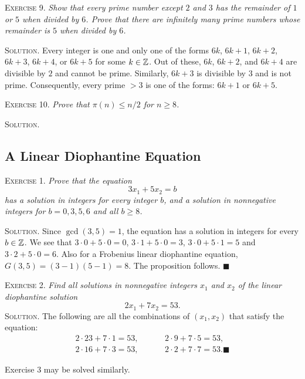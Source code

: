 \documentclass[11pt, leqno]{article}
\newcommand{\done}{\ensuremath{\blacksquare}}
\begin{document}
\textsc{Exercise 9}. \emph{Show that every prime number except $2$ and $3$ has the remainder of $1$ or $5$ when divided by $6$. Prove that there are infinitely many prime numbers whose remainder is $5$ when divided by $6$.}

\textsc{Solution}. Every integer is one and only one of the forms $6k$, $6k+1$, $6k+2$, $6k+3$, $6k+4$, or $6k+5$ for some $k\in\mathbb{Z}$. Out of these, $6k$, $6k+2$, and $6k+4$ are divisible by $2$ and cannot be prime. Similarly, $6k+3$ is divisible by $3$ and is not prime. Consequently, every prime $>3$ is one of the forms: $6k+1$ or $6k+5$.

\textsc{Exercise 10}. \emph{Prove that $\pi(n) \leq n/2$ for $n\geq 8$.}

\textsc{Solution}.

\subsection{A Linear Diophantine Equation}

\textsc{Exercise 1}. \emph{Prove that the equation 
\begin{displaymath}
3x_1 + 5x_2 = b
\end{displaymath}
has a solution in integers for every integer $b$, and a solution in nonnegative integers for $b=0,3,5,6$ and all $b\geq 8$.}

\textsc{Solution}. Since $\gcd(3,5) = 1$, the equation has a solution in integers for every $b\in\mathbb{Z}$. We see that $3\cdot 0 + 5\cdot 0 = 0$, $3\cdot 1 + 5\cdot 0 = 3$, $3\cdot 0 + 5\cdot 1 = 5$ and $3\cdot 2 + 5\cdot 0 = 6$. Also for a Frobenius linear diophantine equation, $G(3,5) = (3-1)(5-1) = 8$. The proposition follows. \done

\textsc{Exercise 2}. \emph{Find all solutions in nonnegative integers $x_1$ and $x_2$ of the linear diophantine solution 
\begin{displaymath}
2x_1 + 7x_2 = 53.
\end{displaymath}}\textsc{Solution}. The following are all the combinations of $(x_1, x_2)$ that satisfy the equation: 
\begin{align*}
  2 \cdot 23 + 7 \cdot 1 = 53, \hspace{1cm} & 2 \cdot 9 + 7 \cdot 5 = 53,\\
  2 \cdot 16 + 7 \cdot 3 = 53, \hspace{1cm} & 2 \cdot 2 + 7 \cdot 7 = 53. \done
\end{align*}

Exercise $3$ may be solved similarly.
\end{document}
